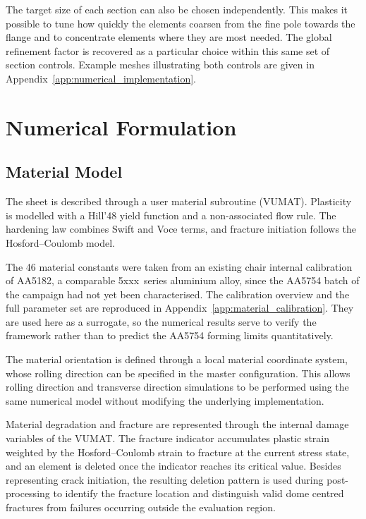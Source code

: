 The target size of each section can also be chosen independently. This makes it
possible to tune how quickly the elements coarsen from the fine pole towards
the flange and to concentrate elements where they are most needed. The global
refinement factor is recovered as a particular choice within this same set of
section controls. Example meshes illustrating both controls are given in
Appendix~\ref{app:numerical_implementation}.

\section{Numerical Formulation}

\subsection{Material Model}

The sheet is described through a user material subroutine
(VUMAT). Plasticity is modelled with a Hill'48 yield function
and a non-associated flow rule. The hardening law combines Swift and Voce
terms, and fracture initiation follows the Hosford--Coulomb model. 

The 46 material constants were taken from an existing chair internal
calibration of AA5182, a comparable \mbox{5xxx series} aluminium alloy, since
the AA5754 batch of the campaign had not yet been characterised. The
calibration overview and the full parameter set are reproduced in
Appendix~\ref{app:material_calibration}. They are used here as a surrogate, so
the numerical results serve to verify the framework rather than to predict the
AA5754 forming limits quantitatively.

The material orientation is defined through a local material coordinate system,
whose rolling direction can be specified in the master configuration. This
allows rolling direction and transverse direction simulations to be performed
using the same numerical model without modifying the underlying implementation.

Material degradation and fracture are represented through the internal damage
variables of the VUMAT. The fracture indicator accumulates plastic strain
weighted by the Hosford--Coulomb strain to fracture at the current stress
state, and an element is deleted once the indicator reaches its critical
value. Besides
representing crack initiation, the resulting deletion pattern is used during
post-processing to identify the fracture location and distinguish valid dome
centred fractures from failures occurring outside the evaluation region.

